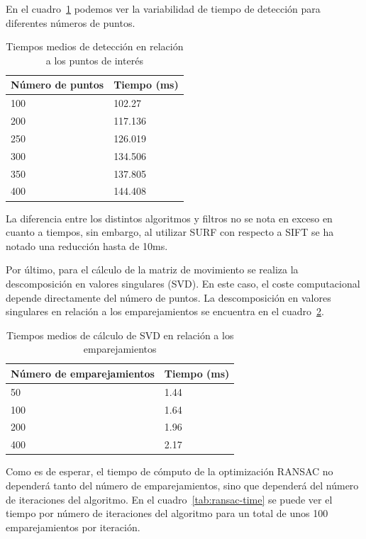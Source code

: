 En el cuadro~\ref{tab:detection-time} podemos ver la variabilidad de tiempo de detección para diferentes números de puntos.

\begin{table}[h]
\caption{Tiempos medios de detección en relación a los puntos de interés}
\label{tab:detection-time}
\centering
\begin{tabular}{ l | l }
\toprule
\textbf{Número de puntos} & \textbf{Tiempo (ms)}\\
\hline\hline
100 & 102.27\\
\hline
200 & 117.136\\
\hline
250 & 126.019\\
\hline
300 & 134.506\\
\hline
350 & 137.805\\
\hline
400 & 144.408\\
\bottomrule
\end{tabular}
\end{table}


La diferencia entre los distintos algoritmos y filtros no se nota en exceso en cuanto a tiempos, sin embargo, al utilizar SURF con respecto a SIFT se ha notado una reducción hasta de 10ms.

Por último, para el cálculo de la matriz de movimiento se realiza la descomposición en valores singulares (SVD). En este caso, el coste computacional depende directamente del número de puntos. La descomposición en valores singulares en relación a los emparejamientos se encuentra en el cuadro~\ref{tab:svd-time}.

\begin{table}
\caption{Tiempos medios de cálculo de SVD en relación a los emparejamientos}
\label{tab:svd-time}
\centering
\begin{tabular}{ l | l }
\toprule
\textbf{Número de emparejamientos} & \textbf{Tiempo (ms)}\\
\hline\hline
50 & 1.44\\
\hline
100 & 1.64\\
\hline
200 & 1.96\\
\hline
400 & 2.17\\
\bottomrule
\end{tabular}
\end{table}

Como es de esperar, el tiempo de cómputo de la optimización RANSAC no dependerá tanto del número de emparejamientos, sino que dependerá del número de iteraciones del algoritmo. En el cuadro~\ref{tab:ransac-time} se puede ver el tiempo por número de iteraciones del algoritmo para un total de unos 100 emparejamientos por iteración.

